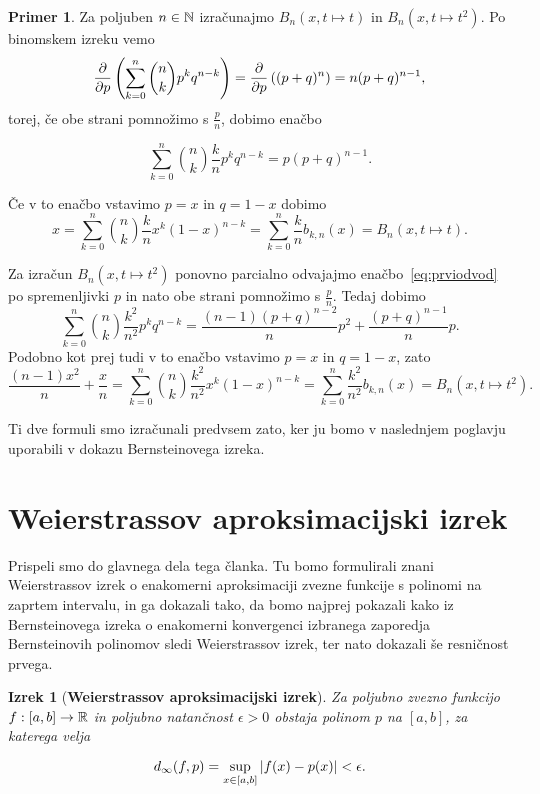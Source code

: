 \documentclass[a4paper, reqno]{amsart}
\theoremstyle{theorem}
\newtheorem{izrek}{Izrek}[section]
\theoremstyle{definition}
\newtheorem{primer}[definicija]{Primer}
\begin{document}
\begin{primer}
	\label{B polinom primer}
	\cite{Kadison}
	Za poljuben $n \in \mathbb{N}$ izračunajmo $B_n(x, t \mapsto t)$ in $B_n(x, t \mapsto t^2)$. 
	Po binomskem izreku vemo
$$
\pdv{p}\left( \sum_{k=0}^n \binom nk p^k q^{n-k}\right) = \pdv{p}\left((p + q)^n\right) =
n (p + q)^{n - 1}\text{,}
$$
torej, če obe strani pomnožimo s $\frac pn$, dobimo enačbo

\begin{equation}
	\sum_{k=0}^n \binom nk \frac kn p^k q^{n-k} = p(p + q)^{n - 1}\text{.}
	\label{eq:prviodvod}
\end{equation}

\noindent
Če v to enačbo vstavimo $p = x$ in $q = 1 - x$ dobimo
$$
x = \sum_{k=0}^n \binom nk \frac kn x^k (1 - x)^{n-k} = 
\sum_{k = 0}^n \frac kn b_{k,n}(x) =
B_n(x, t \mapsto t)\text{.}
$$

Za izračun $B_n(x, t \mapsto t^2)$ ponovno parcialno odvajajmo 
enačbo~\eqref{eq:prviodvod} po spremenljivki $p$ in nato obe strani
pomnožimo s $\frac pn$. Tedaj dobimo
$$
\sum_{k=0}^n \binom nk \frac {k^2}{n^2} p^k q^{n-k} = 
\frac {(n - 1)(p + q)^{n - 2}}{n}p^2 + \frac{(p + q)^{n - 1}}{n}p\text{.}
$$
Podobno kot prej tudi v to enačbo vstavimo $p = x$ in $q = 1 - x$, zato
$$
\frac{(n - 1)x^2}{n} + \frac xn = 
\sum_{k=0}^n \binom nk \frac {k^2}{n^2} x^k (1 - x)^{n-k} = 
\sum_{k = 0}^n \frac{k^2}{n^2} b_{k,n}(x) =
B_n(x, t \mapsto t^2)\text{.}
$$

Ti dve formuli smo izračunali predvsem zato, ker ju bomo v naslednjem poglavju uporabili
v dokazu Bernsteinovega izreka.
\end{primer}


\section{Weierstrassov aproksimacijski izrek}

\par
Prispeli smo do glavnega dela tega članka. Tu bomo formulirali znani Weierstrassov
izrek o enakomerni aproksimaciji zvezne funkcije s polinomi na zaprtem intervalu,
in ga dokazali tako, da bomo najprej pokazali kako iz Bernsteinovega izreka o 
enakomerni konvergenci izbranega zaporedja Bernsteinovih polinomov sledi 
Weierstrassov izrek, ter nato dokazali še resničnost prvega. 

\begin{izrek}[\textbf{Weierstrassov aproksimacijski izrek}]
	\label{Weierstrass}
	Za poljubno zvezno funkcijo $f: [a, b] \to \mathbb{R}$ in poljubno natančnost $\epsilon > 0$
	obstaja polinom $p$ na $[a,b]$, za katerega velja

	$$ d_{\infty}(f, p) = \sup_{x \in [a, b]} |f(x)-p(x)| < \epsilon\text{.}$$
	
\end{izrek}
	
\end{document}
